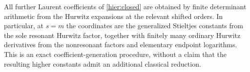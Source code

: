 All further Laurent coefficients of \eqref{hier:closed} are obtained
by finite determinant arithmetic from the Hurwitz expansions at the
relevant shifted orders.  In particular, at $s=m$ the coordinates are
the generalized Stieltjes constants from the sole resonant Hurwitz
factor, together with finitely many ordinary Hurwitz derivatives from
the nonresonant factors and elementary endpoint logarithms.  This is
an exact coefficient-generation procedure, without a claim that the
resulting higher constants admit an additional classical reduction.
